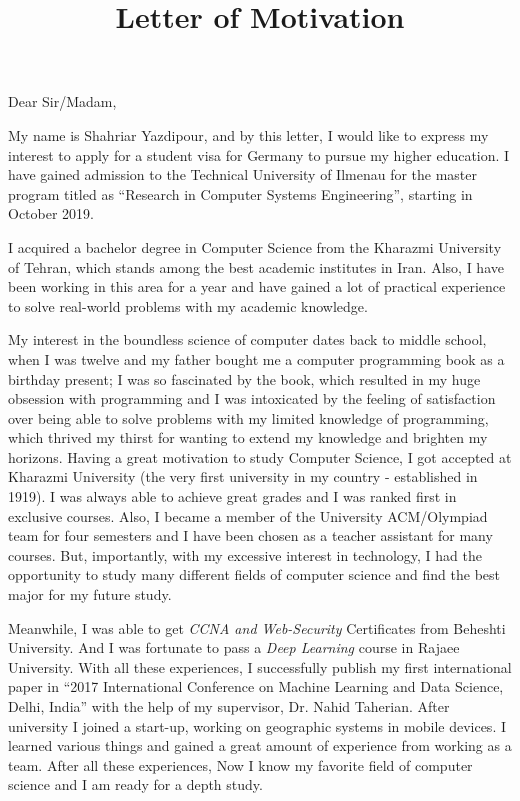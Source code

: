 \documentclass{article}
\title{Letter of Motivation}
\begin{document}
  \maketitle%
  \thispagestyle{empty}
  \vspace{16pt}

Dear Sir/Madam,

My name is Shahriar Yazdipour, and by this letter, I would like to express my interest to apply for a student visa for Germany to pursue my higher education. I have gained admission to the Technical University of Ilmenau for the master program titled as “Research in Computer Systems Engineering”, starting in October 2019.

I acquired a bachelor degree in Computer Science from the Kharazmi University of Tehran, which stands among the best academic institutes in Iran. Also, I have been working in this area for a year and have gained a lot of practical experience to solve real-world problems with my academic knowledge.

My interest in the boundless science of computer dates back to middle school, when I was  twelve and my father bought me a computer programming book as a birthday present; I was so fascinated by the book, which resulted in my huge obsession with programming and I was intoxicated by the feeling of satisfaction over being able to solve problems with my limited knowledge of programming, which thrived my thirst for wanting to extend my knowledge and brighten my horizons. Having a great motivation to study Computer Science, I got accepted at Kharazmi University (the very first university in my country - established in 1919). I was always able to achieve great grades and I was ranked first in exclusive courses. Also, I became a member of the University ACM/Olympiad team for four semesters and I have been chosen as a teacher assistant for many courses. But, importantly, with my excessive interest in technology, I had the opportunity to study many different fields of computer science and find the best major for my future study.

Meanwhile, I was able to get \textit{CCNA and Web-Security} Certificates from Beheshti University. And I was fortunate to pass a \textit{Deep Learning} course in Rajaee University. With all these experiences, I successfully publish my first international paper in “2017 International Conference on Machine Learning and Data Science, Delhi, India” with the help of my supervisor, Dr. Nahid Taherian. After university I joined a start-up, working on geographic systems in mobile devices. I learned various things and gained a great amount of experience from working as a team. After all these experiences, Now I know my favorite field of computer science and I am ready for a depth study.
\end{document}
